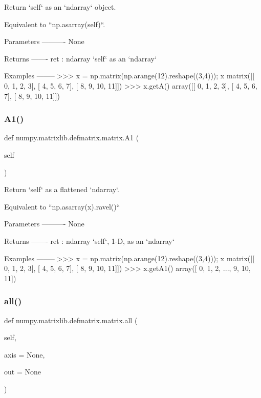 \begin{DoxyVerb}Return `self` as an `ndarray` object.

Equivalent to ``np.asarray(self)``.

Parameters
----------
None

Returns
-------
ret : ndarray
    `self` as an `ndarray`

Examples
--------
>>> x = np.matrix(np.arange(12).reshape((3,4))); x
matrix([[ 0,  1,  2,  3],
[ 4,  5,  6,  7],
[ 8,  9, 10, 11]])
>>> x.getA()
array([[ 0,  1,  2,  3],
       [ 4,  5,  6,  7],
       [ 8,  9, 10, 11]])\end{DoxyVerb}
 \mbox{\label{classnumpy_1_1matrixlib_1_1defmatrix_1_1matrix_a1fcd626410a038b6250822f00cfc6df5}} 
\subsubsection{\texorpdfstring{A1()}{A1()}}
{\footnotesize\ttfamily def numpy.\+matrixlib.\+defmatrix.\+matrix.\+A1 (\begin{DoxyParamCaption}\item[{}]{self }\end{DoxyParamCaption})}

\begin{DoxyVerb}Return `self` as a flattened `ndarray`.

Equivalent to ``np.asarray(x).ravel()``

Parameters
----------
None

Returns
-------
ret : ndarray
    `self`, 1-D, as an `ndarray`

Examples
--------
>>> x = np.matrix(np.arange(12).reshape((3,4))); x
matrix([[ 0,  1,  2,  3],
[ 4,  5,  6,  7],
[ 8,  9, 10, 11]])
>>> x.getA1()
array([ 0,  1,  2, ...,  9, 10, 11])\end{DoxyVerb}
 \mbox{\label{classnumpy_1_1matrixlib_1_1defmatrix_1_1matrix_ac90915ca30bbddf0387f79359414f7a5}} 
\subsubsection{\texorpdfstring{all()}{all()}}
{\footnotesize\ttfamily def numpy.\+matrixlib.\+defmatrix.\+matrix.\+all (\begin{DoxyParamCaption}\item[{}]{self,  }\item[{}]{axis = {\ttfamily None},  }\item[{}]{out = {\ttfamily None} }\end{DoxyParamCaption})}

